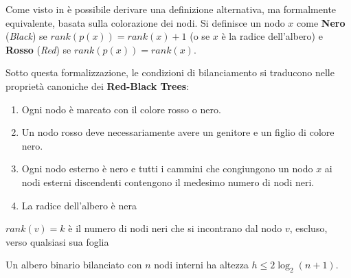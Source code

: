 Come visto in \cite{tarjan1983data} è possibile derivare una definizione alternativa, ma formalmente equivalente, basata sulla colorazione dei nodi. Si definisce un nodo $x$ come \textbf{Nero} (\textit{Black}) se $rank(p(x)) = rank(x) + 1$ (o se $x$ è la radice dell'albero) e \textbf{Rosso} (\textit{Red}) se $rank(p(x)) = rank(x)$. 


Sotto questa formalizzazione, le condizioni di bilanciamento si traducono nelle proprietà canoniche dei \textbf{Red-Black Trees}:

\begin{enumerate}
    \item Ogni nodo è marcato con il colore rosso o nero.
    \item Un nodo rosso deve necessariamente avere un genitore e un figlio di colore nero.
    \item Ogni nodo esterno è nero e tutti i cammini che congiungono un nodo $x$ ai nodi esterni discendenti contengono il medesimo numero di nodi neri.
    \item La radice dell'albero è nera
\end{enumerate}

\begin{kaobox}[frametitle=Note]
$rank(v) = k$ è il numero di nodi neri che si incontrano dal nodo $v$, escluso, verso qualsiasi sua foglia
\end{kaobox} 

\begin{lemma}
Un albero binario bilanciato con $n$ nodi interni ha altezza  $h \leq 2\log_2(n+1)$.
\end{lemma}

